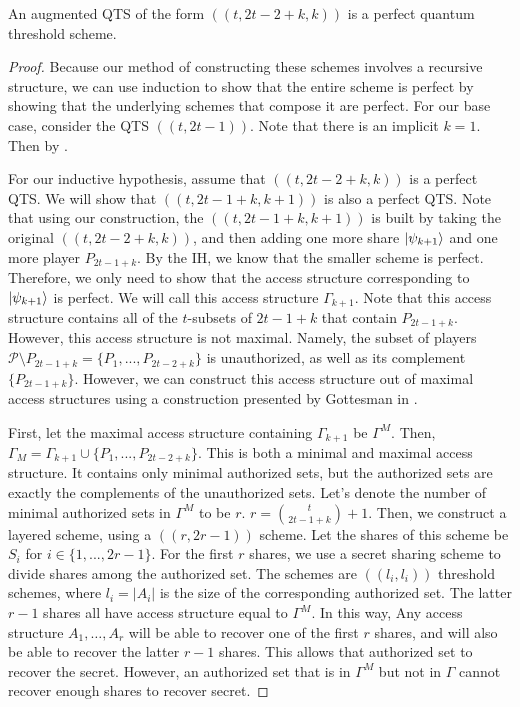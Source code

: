 \begin{theorem}
    An augmented QTS of the form $((t,2t-2+k,k))$ is a perfect quantum threshold scheme.
\end{theorem}

\begin{proof}
    Because our method of constructing these schemes involves a recursive structure, we can use induction to show that the entire scheme is perfect by showing that the underlying schemes that compose it are perfect. For our base case, consider the QTS $((t,2t-1))$. Note that there is an implicit $k=1$. Then by .
    
    For our inductive hypothesis, assume that $((t,2t-2+k,k))$ is a perfect QTS. We will show that $((t,2t-1+k,k+1))$ is also a perfect QTS. Note that using our construction, the $((t,2t-1+k,k+1))$ is built by taking the original $((t,2t-2+k,k))$, and then adding one more share $\ket{\psi_{k+1}}$ and one more player $P_{2t-1+k}$. By the IH, we know that the smaller scheme is perfect. Therefore, we only need to show that the access structure corresponding to $\ket{\psi_{k+1}}$ is perfect. We will call this access structure $\Gamma_{k+1}$. Note that this access structure contains all of the $t$-subsets of $2t-1+k$ that contain $P_{2t-1+k}$. However, this access structure is not maximal. Namely, the subset of players $\mathcal{P} \setminus P_{2t-1+k} = \{P_1,...,P_{2t-2+k}\}$ is unauthorized, as well as its complement $\{P_{2t-1+k}\}$. However, we can construct this access structure out of maximal access structures using a construction presented by Gottesman in \cite{gottesman_theory_2000}.
    
    First, let the maximal access structure containing $\Gamma_{k+1}$ be $\Gamma^M$. Then, $\Gamma_M = \Gamma_{k+1} \cup \{P_1,...,P_{2t-2+k}\}$. This is both a minimal and maximal access structure. It contains only minimal authorized sets, but the authorized sets are exactly the complements of the unauthorized sets. Let's denote the number of minimal authorized sets in $\Gamma^M$ to be $r$. $r = \binom{t}{2t-1+k} + 1$. Then, we construct a layered scheme, using a $((r,2r-1))$ scheme. Let the shares of this scheme be $S_i$ for $i \in \{1,...,2r-1\}$. For the first $r$ shares, we use a secret sharing scheme to divide shares among the authorized set. The schemes are $((l_i,l_i))$ threshold schemes, where $l_i = |A_i|$ is the size of the corresponding authorized set. The latter $r-1$ shares all have access structure equal to $\Gamma^M$. In this way, Any access structure $A_1,\dots,A_r$ will be able to recover one of the first $r$ shares, and will also be able to recover the latter $r-1$ shares. This allows that authorized set to recover the secret. However, an authorized set that is in $\Gamma^M$ but not in $\Gamma$ cannot recover enough shares to recover secret. 
    

\end{proof}
